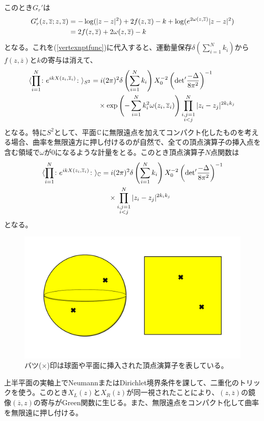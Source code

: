 このとき$G_r'$は
\begin{align}
G_r'(z,\overline{z};z,\overline{z})&=-\log(|z-z|^2)+2f(z,\overline{z})-k+\log(e^{2\omega(z,\overline{z})}|z-z|^2)\notag\\
&=2f(z,\overline{z})+2\omega(z,\overline{z})-k
\end{align}
となる。これを(\ref{vertexnptfunc})に代入すると、運動量保存$\delta\left(\sum_{i=1}^{N}k_i \right)$から$f(z,\overline{z})$と$k$の寄与は消えて、
\begin{align}
\langle \prod_{i=1}^{N} \colon e^{ikX(z_i,\overline{z}_i)}\colon  \rangle_{S^2}&=i(2\pi)^2\delta\left(\sum_{i=1}^{N}k_i \right)X_0^{-2}\left(\text{det}' \frac{-\Delta}{8\pi^2} \right)^{-1}\notag\\
&\quad \times \exp\left( -\sum_{i=1}^{N}k_i^2\omega(z_i,\overline{z}_i) \right)\prod_{\substack{i,j=1\\i<j}}^{N}|z_i-z_j|^{2k_ik_j}
\end{align}
となる。特に$S^2$として、平面$\mathbb{C}$に無限遠点を加えてコンパクト化したものを考える場合、曲率を無限遠方に押し付けるのが自然で、全ての頂点演算子の挿入点を含む領域で$\omega$が$0$になるような計量をとる。このとき頂点演算子$N$点関数は
\begin{align}\label{vertexnptSphere}
\langle \prod_{i=1}^{N} \colon e^{ikX(z_i,\overline{z}_i)}\colon  \rangle_{\mathbb{C}}&=i(2\pi)^2\delta\left(\sum_{i=1}^{N}k_i \right)X_0^{-2}\left(\text{det}' \frac{-\Delta}{8\pi^2} \right)^{-1}\notag\\
&\quad \times \prod_{\substack{i,j=1\\i<j}}^{N}|z_i-z_j|^{2k_ik_j}
\end{align}
となる。
\begin{figure}[h]
	\centering
	\includegraphics[width=0.7\linewidth]{sphereCF.pdf}
	\caption{バツ($\times$)印は球面や平面に挿入された頂点演算子を表している。}
	\label{fig:spherecf}
\end{figure}


上半平面の実軸上でNeumannまたはDirichlet境界条件を課して、二重化のトリックを使う。このとき$X_L(z)$と$X_R(\overline{z})$が同一視されたことにより、$(z,\overline{z})$の鏡像$(\overline{z},z)$の寄与がGreen関数に生じる。また、無限遠点をコンパクト化して曲率を無限遠に押し付ける。

